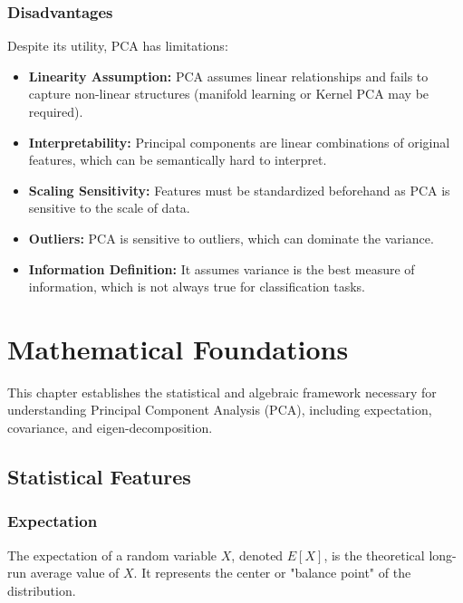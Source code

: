 \documentclass[12pt, a4paper]{report}
\begin{document}
\subsection{Disadvantages}
Despite its utility, PCA has limitations:
\begin{itemize}
    \item \textbf{Linearity Assumption:} PCA assumes linear relationships and fails to capture non-linear structures (manifold learning or Kernel PCA may be required).
    \item \textbf{Interpretability:} Principal components are linear combinations of original features, which can be semantically hard to interpret.
    \item \textbf{Scaling Sensitivity:} Features must be standardized beforehand as PCA is sensitive to the scale of data.
    \item \textbf{Outliers:} PCA is sensitive to outliers, which can dominate the variance.
    \item \textbf{Information Definition:} It assumes variance is the best measure of information, which is not always true for classification tasks.
\end{itemize}





\newpage
\chapter{Mathematical Foundations}

This chapter establishes the statistical and algebraic framework necessary for understanding Principal Component Analysis (PCA), including expectation, covariance, and eigen-decomposition.

\section{Statistical Features}

\subsection{Expectation}
The expectation of a random variable $X$, denoted $E[X]$, is the theoretical long-run average value of $X$. It represents the center or "balance point" of the distribution.
\end{document}
